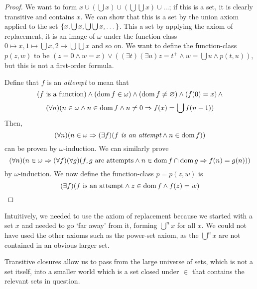 \begin{proof}
    We want to form \( x \cup (\bigcup x) \cup (\bigcup\bigcup x) \cup \dots \); if this is a set, it is clearly transitive and contains \( x \).
    We can show that this is a set by the union axiom applied to the set \( \qty{x, \bigcup x, \bigcup\bigcup x, \dots} \).
    This a set by applying the axiom of replacement, it is an image of \( \omega \) under the function-class \( 0 \mapsto x, 1 \mapsto \bigcup x, 2 \mapsto \bigcup \bigcup x \) and so on.
    We want to define the function-class \( p(z,w) \) to be \( (z = 0 \wedge w = x) \vee ((\exists t)(\exists u) z = t^+ \wedge w = \bigcup u \wedge p(t,u)) \), but this is not a first-order formula.

    Define that \( f \) is an \emph{attempt} to mean that
    \[ (f \text{ is a function}) \wedge (\operatorname{dom} f \in \omega) \wedge (\operatorname{dom} f \neq \varnothing) \wedge (f(0) = x)\, \wedge \]
    \[ (\forall n)(n \in \omega \wedge n \in \operatorname{dom} f \wedge n \neq 0 \Rightarrow f(x) = \bigcup f(n-1)) \]
    Then,
    \[ (\forall n)(n \in \omega \Rightarrow (\exists f)(f \emph{ is an attempt} \wedge n \in \operatorname{dom} f)) \]
    can be proven by \( \omega \)-induction.
    We can similarly prove
    \[ (\forall n)(n \in \omega \Rightarrow (\forall f)(\forall g)(f, g \text{ are attempts} \wedge n \in \operatorname{dom} f \cap \operatorname{dom} g \Rightarrow f(n) = g(n))) \]
    by \( \omega \)-induction.
    We now define the function-class \( p = p(z,w) \) is
    \[ (\exists f)(f \text{ is an attempt} \wedge z \in \operatorname{dom} f \wedge f(z) = w) \]
\end{proof}
Intuitively, we needed to use the axiom of replacement because we started with a set \( x \) and needed to go `far away' from it, forming \( \bigcup^n x \) for all \( x \).
We could not have used the other axioms such as the power-set axiom, as the \( \bigcup^n x \) are not contained in an obvious larger set.

Transitive closures allow us to pass from the large universe of sets, which is not a set itself, into a smaller world which is a set closed under \( \in \) that contains the relevant sets in question.

